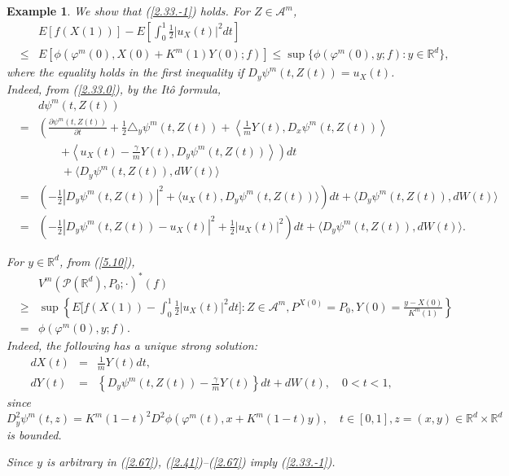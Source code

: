 \documentclass[12pt]{article}
\newtheorem{example}{Example}[section]
\begin{document}
\begin{example}
We show that (\ref{2.33.-1}) holds. 
For $Z\in \mathcal{A}^m$,  
\begin{eqnarray}\label{5.10}
&&E[f(X(1))]-E\left[\int_0^1 \frac{1}{2}|u_X(t)|^2dt\right]\\
&\le& E[\phi(\varphi^m (0),X(0)+K^m(1)Y(0);f)]\le\sup\{\phi(\varphi^m (0),y;f):y\in\mathbb{R}^d \},\nonumber
\end{eqnarray}
where the equality holds in the first inequality if $D_y\psi^m(t,Z(t))=u_X(t)$.
Indeed, from (\ref{2.33.0}), by the It\^o formula, 
\begin{eqnarray*}
&&d\psi^m(t,Z(t))\\
&=&\left(\frac{\partial\psi^m(t,Z(t))}{\partial t}+\frac{1}{2}\triangle_y\psi^m(t,Z(t))
+\left\langle \frac{1}{m}Y(t),D_x\psi^m(t,Z(t))\right\rangle\right.\\
&&\qquad \left.+\left\langle u_X(t)-\frac{\gamma}{m}Y(t),D_y\psi^m(t,Z(t))\right\rangle\right)dt\\
&&\qquad +\langle D_y\psi^m(t,Z(t)), dW(t)\rangle\\
&=&\left(-\frac{1}{2}|D_y\psi^m(t,Z(t))|^2+\langle u_X(t), D_y\psi^m(t,Z(t))\rangle\right)dt
+\langle D_y\psi^m(t,Z(t)), dW(t)\rangle\\
&=&\left(-\frac{1}{2}|D_y\psi^m(t,Z(t))-u_X(t)|^2+\frac{1}{2}|u_X(t)|^2\right)dt
+\langle D_y\psi^m(t,Z(t)), dW(t)\rangle.
\end{eqnarray*}

For $y\in\mathbb{R}^d$, %
 from (\ref{5.10}),
\begin{eqnarray}\label{2.67}
&&V^m(\mathcal{P}(\mathbb{R}^d ), P_0;\cdot)^*(f)\\
&\ge &\sup \left\{E\biggl[f(X(1))-\int_0^1 \frac{1}{2}|u_X(t)|^2dt \biggr]:
Z\in \mathcal{A}^m, 
P^{X(0)}=P_0, Y(0)=\frac{y-X(0)}{K^m(1)}\right\}\nonumber\\
&=&\phi(\varphi^m (0),y;f).\nonumber
\end{eqnarray}
Indeed, the following has a unique strong solution:
\begin{eqnarray*}
dX(t)&=&\frac{1}{m}Y(t)dt,\\%
dY(t)&=&\left\{D_y\psi^m(t,Z(t))-\frac{\gamma }{m}Y(t)\right\}dt+dW(t),\quad 0< t<1,%
\end{eqnarray*}
since
$$D^2_y\psi^m(t,z)=K^m(1-t)^2D^2\phi(\varphi^m (t),x+K^m(1-t)y),\quad 
t\in [0,1], z=(x,y)\in \mathbb{R}^d\times \mathbb{R}^d
$$
is bounded.

Since $y$ is arbitrary in (\ref{2.67}), (\ref{2.41})--(\ref{2.67}) imply (\ref{2.33.-1}).
\end{example}
\end{document}
